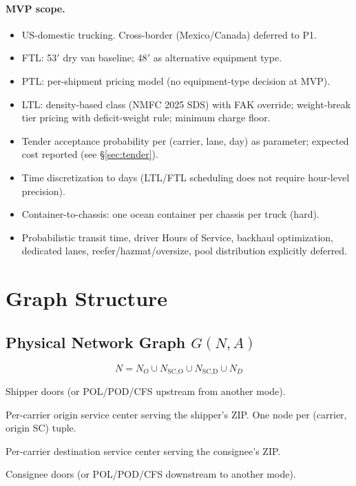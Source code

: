 \documentclass[11pt,a4paper]{article}
\theoremstyle{definition}
\begin{document}
\paragraph{MVP scope.}
\begin{itemize}[noitemsep]
  \item US-domestic trucking. Cross-border (Mexico/Canada) deferred to P1.
  \item FTL: 53$'$ dry van baseline; 48$'$ as alternative equipment type.
  \item PTL: per-shipment pricing model (no equipment-type decision at MVP).
  \item LTL: density-based class (NMFC 2025 SDS) with FAK override; weight-break tier pricing
        with deficit-weight rule; minimum charge floor.
  \item Tender acceptance probability per (carrier, lane, day) as parameter; expected cost
        reported (see \S\ref{sec:tender}).
  \item Time discretization to days (LTL/FTL scheduling does not require hour-level precision).
  \item Container-to-chassis: one ocean container per chassis per truck (hard).
  \item Probabilistic transit time, driver Hours of Service, backhaul optimization, dedicated
        lanes, reefer/hazmat/oversize, pool distribution explicitly deferred.
\end{itemize}

\section{Graph Structure}

\subsection{Physical Network Graph \texorpdfstring{$G(N, A)$}{G(N,A)}}

\[
  N = N_O \cup N_{\text{SC,O}} \cup N_{\text{SC,D}} \cup N_D
\]

\begin{description}[leftmargin=3.4cm, labelwidth=3.2cm, style=nextline]
  \item[$N_O$ — Origins] Shipper doors (or POL/POD/CFS upstream from another mode).
  \item[$N_{\text{SC,O}}$ — LTL origin service centers] Per-carrier origin service center
        serving the shipper's ZIP. One node per (carrier, origin SC) tuple.
  \item[$N_{\text{SC,D}}$ — LTL destination service centers] Per-carrier destination service
        center serving the consignee's ZIP.
  \item[$N_D$ — Destinations] Consignee doors (or POL/POD/CFS downstream to another mode).
\end{description}
\end{document}
